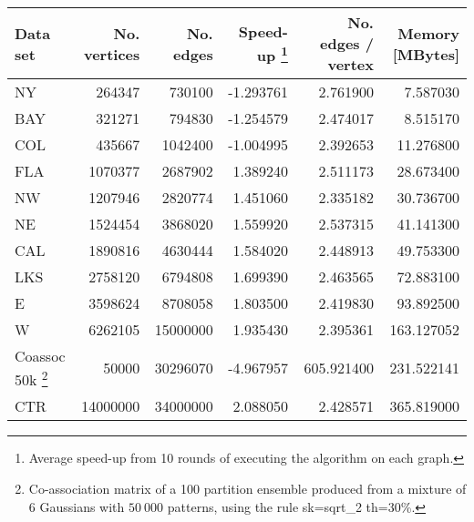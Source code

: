 \begin{minipage}[h]{\hsize}
	\centering
\begin{tabular}{lrrrrr}
\toprule
Data set &  No. vertices &   No. edges &     Speed-up \footnote{Average speed-up from 10 rounds of executing the algorithm on each graph.} &  No. edges / vertex & Memory [MBytes]\\
\midrule

NY                           &      264347 &    730100 & -1.293761 &          2.761900 &    7.587030 \\
BAY                          &      321271 &    794830 & -1.254579 &          2.474017 &    8.515170 \\
COL                          &      435667 &   1042400 & -1.004995 &          2.392653 &   11.276800 \\
FLA                          &     1070377 &   2687902 &  1.389240 &          2.511173 &   28.673400 \\
NW                           &     1207946 &   2820774 &  1.451060 &          2.335182 &   30.736700 \\
NE                           &     1524454 &   3868020 &  1.559920 &          2.537315 &   41.141300 \\
CAL                          &     1890816 &   4630444 &  1.584020 &          2.448913 &   49.753300 \\
LKS                          &     2758120 &   6794808 &  1.699390 &          2.463565 &   72.883100 \\
E                            &     3598624 &   8708058 &  1.803500 &          2.419830 &   93.892500 \\
W                            &     6262105 &  15000000 &  1.935430 &          2.395361 &  163.127052 \\
Coassoc 50k \footnote{Co-association matrix of a 100 partition ensemble produced from a mixture of 6 Gaussians with $50 \: 000$ patterns, using the rule sk=sqrt\_2 th=30\%.} &       50000 &  30296070 & -4.967957 &        605.921400 &  231.522141 \\
CTR                          &    14000000 &  34000000 &  2.088050 &          2.428571 &  365.819000 \\

\bottomrule
\end{tabular}
\label{tab:mst speedup}
\end{minipage}